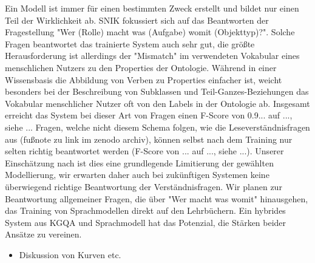 \documentclass[utf8,biblatex]{lni}
\begin{document}
Ein Modell ist immer für einen bestimmten Zweck erstellt und bildet nur einen Teil der Wirklichkeit ab.
SNIK fokussiert sich auf das Beantworten der Fragestellung "Wer (Rolle) macht was (Aufgabe) womit (Objekttyp)?".
Solche Fragen beantwortet das trainierte System auch sehr gut, die größte Herausforderung ist allerdings der "Mismatch" im verwendeten Vokabular eines menschlichen Nutzers zu den Properties der Ontologie.
Während in einer Wissensbasis die Abbildung von Verben zu Properties einfacher ist, weicht besonders bei der Beschreibung von Subklassen und Teil-Ganzes-Beziehungen das Vokabular menschlicher Nutzer oft von den Labels in der Ontologie ab.
Insgesamt erreicht das System bei dieser Art von Fragen  einen F-Score von 0.9... auf ..., siehe ...
Fragen, welche nicht diesem Schema folgen, wie die Leseverständnisfragen aus \cite{bb} (fußnote zu link im zenodo archiv), können selbst nach dem Training nur selten richtig beantwortet werden (F-Score von ... auf ..., siehe ...).
Unserer Einschätzung nach ist dies eine grundlegende Limitierung der gewählten Modellierung, wir erwarten daher auch bei zukünftigen Systemen keine überwiegend richtige Beantwortung der Verständnisfragen.
Wir planen zur Beantwortung allgemeiner Fragen, die über "Wer macht was womit" hinausgehen, das Training von Sprachmodellen direkt auf den Lehrbüchern.
Ein hybrides System aus KGQA und Sprachmodell hat das Potenzial, die Stärken beider Ansätze zu vereinen.

\begin{itemize}
  \item Diskussion von Kurven etc.
\end{itemize}

\printbibliography
\end{document}

